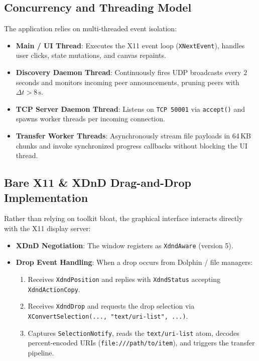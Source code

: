 \documentclass[11pt,a4paper]{article}
\begin{document}
\subsection{Concurrency and Threading Model}
The application relies on multi-threaded event isolation:
\begin{itemize}
    \item \textbf{Main / UI Thread}: Executes the X11 event loop (\texttt{XNextEvent}), handles user clicks, state mutations, and canvas repaints.
    \item \textbf{Discovery Daemon Thread}: Continuously fires UDP broadcasts every $2$ seconds and monitors incoming peer announcements, pruning peers with $\Delta t > 8\,\text{s}$.
    \item \textbf{TCP Server Daemon Thread}: Listens on \texttt{TCP 50001} via \texttt{accept()} and spawns worker threads per incoming connection.
    \item \textbf{Transfer Worker Threads}: Asynchronously stream file payloads in 64\,KB chunks and invoke synchronized progress callbacks without blocking the UI thread.
\end{itemize}

\subsection{Bare X11 \& XDnD Drag-and-Drop Implementation}
Rather than relying on toolkit bloat, the graphical interface interacts directly with the X11 display server:
\begin{itemize}
    \item \textbf{XDnD Negotiation}: The window registers as \texttt{XdndAware} (version 5).
    \item \textbf{Drop Event Handling}: When a drop occurs from Dolphin / file managers:
    \begin{enumerate}
        \item Receives \texttt{XdndPosition} and replies with \texttt{XdndStatus} accepting \texttt{XdndActionCopy}.
        \item Receives \texttt{XdndDrop} and requests the drop selection via \texttt{XConvertSelection(..., "text/uri-list", ...)}.
        \item Captures \texttt{SelectionNotify}, reads the \texttt{text/uri-list} atom, decodes percent-encoded URIs (\texttt{file:///path/to/item}), and triggers the transfer pipeline.
    \end{enumerate}
\end{itemize}
\end{document}
